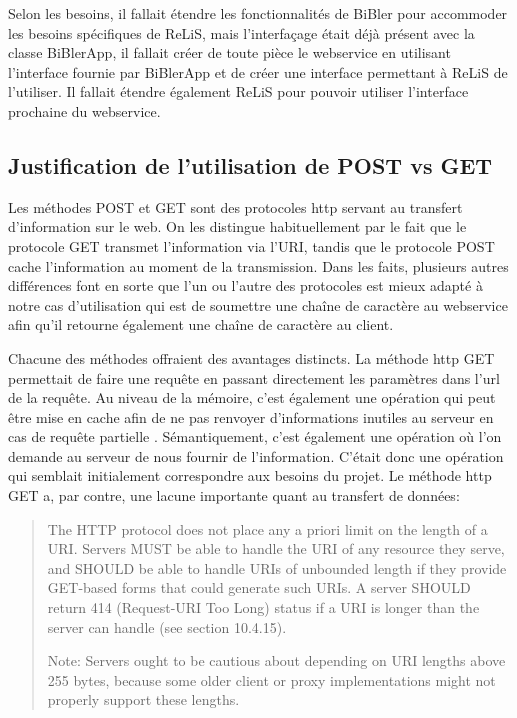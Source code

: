 \documentclass[12pt,titlepage]{article}
\begin{document}
Selon les besoins, il fallait étendre les fonctionnalités de BiBler pour accommoder les besoins spécifiques de ReLiS, mais l'interfaçage était déjà présent avec la classe BiBlerApp, il fallait créer de toute pièce le webservice en utilisant l'interface fournie par BiBlerApp et de créer une interface permettant à ReLiS de l'utiliser. Il fallait étendre également ReLiS pour pouvoir utiliser l'interface prochaine du webservice. \newline



\subsection{Justification de l'utilisation de POST vs GET}
Les méthodes POST et GET sont des protocoles http servant au transfert d'information sur le web. On les distingue habituellement par le fait que le protocole GET transmet l'information via l'URI, tandis que le protocole POST cache l'information au moment de la transmission. Dans les faits, plusieurs autres différences font en sorte que l'un ou l'autre des protocoles est mieux adapté à notre cas d'utilisation qui est de soumettre une chaîne de caractère au webservice afin qu'il retourne également une chaîne de caractère au client.\newline

Chacune des méthodes offraient des avantages distincts. La méthode http GET permettait de faire une requête en passant directement les paramètres dans l'url de la requête. Au niveau de la mémoire, c'est également une opération qui peut être mise en cache afin de ne pas renvoyer d'informations inutiles au serveur en cas de requête partielle \cite{w3b}. Sémantiquement, c'est également une opération où l'on demande au serveur de nous fournir de l'information. C'était donc une opération qui semblait initialement correspondre aux besoins du projet. Le méthode http GET a, par contre, une lacune importante quant au transfert de données:

\blockquote {The HTTP protocol does not place any a priori limit on the length of a URI. Servers MUST be able to handle the URI of any resource they serve, and SHOULD be able to handle URIs of unbounded length if they provide GET-based forms that could generate such URIs. A server SHOULD return 414 (Request-URI Too Long) status if a URI is longer than the server can handle (see section 10.4.15).

      Note: Servers ought to be cautious about depending on URI lengths
      above 255 bytes, because some older client or proxy
      implementations might not properly support these lengths. \cite{w3c}
      } 
      
\end{document}
